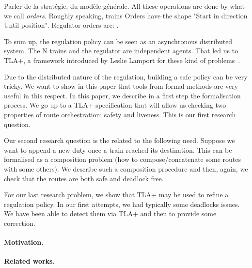 \documentclass[runningheads]{llncs}
\begin{document}
 Parler de la stratégie, du modèle générale. All these operations are done by what we call  \emph{orders}. Roughly speaking, trains Orders have the shape "Start in direction Until position". Regulator orders are: . 
 
 
 To sum up, the regulation policy can be seen as an asynchronous distributed system. The N trains and the regulator are independent agents. That led us to TLA+, a framework introduced by Leslie Lamport for these kind of problems~\cite{Lamport}.  
 
 
 
Due to the distributed nature of the regulation, building a safe policy can be very tricky. We want to show in this paper that tools from formal methods are very useful in this respect.  In this paper, we describe in  a first step the formalisation process. We go up to a TLA+ specification that will allow us checking two properties of route orchestration: safety and liveness. This is our first research question. 

Our second research question is the related to the following need. Suppose we want to append a new duty once a train reached its destination. This can be formalised as a composition problem (how to compose/concatenate some routes with some others). We describe such a composition procedure and then, again, we check that the routes are both safe and deadlock free. 

For our last research problem, we show that TLA+ may be used to refine a regulation policy. In our first attempts, we had typically some deadlocks issues. We have been able to detect them via TLA+ and then to provide some correction. 

\paragraph{Motivation.}

\paragraph{Related works.}
\end{document}
